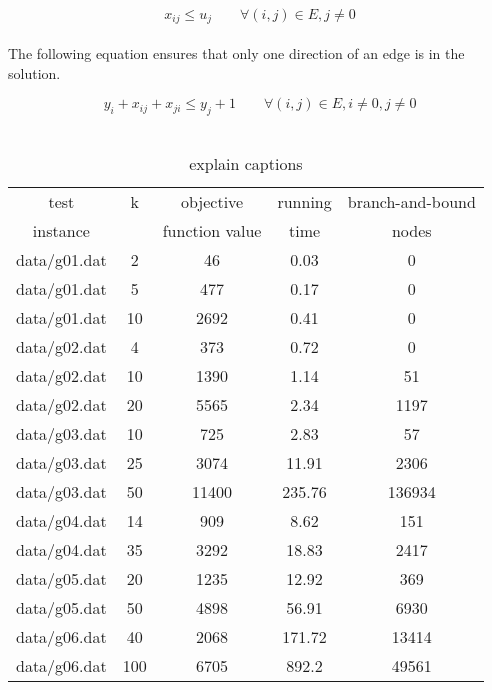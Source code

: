 \begin{equation}
  x_{ij} \leq u_j \qquad \forall (i,j) \in E, j \neq 0
\end{equation}
\\
The following equation ensures that only one direction of an edge is in the solution.

\begin{equation}
 y_{i} + x_{ij} + x_{ji} \leq y_{j} + 1 \qquad \forall (i,j) \in E, i \neq 0, j \neq 0
\end{equation}
\\

\begin{table} 
\small
\centering
\begin{tabular}{ccccc}
\hline
test     & k & objective      & running & branch-and-bound \\
instance &   & function value & time    & nodes \\
\hline
data/g01.dat		& 2	& 46	& 0.03	& 0	\\ 
data/g01.dat		& 5	& 477	& 0.17	& 0	\\ 
data/g01.dat		& 10	& 2692	& 0.41	& 0	\\ 
data/g02.dat		& 4	& 373	& 0.72	& 0	\\ 
data/g02.dat		& 10	& 1390	& 1.14	& 51	\\ 
data/g02.dat		& 20	& 5565	& 2.34	& 1197	\\ 
data/g03.dat		& 10	& 725	& 2.83	& 57	\\ 
data/g03.dat		& 25	& 3074	& 11.91	& 2306	\\ 
data/g03.dat		& 50	& 11400	& 235.76	& 136934	\\ 
data/g04.dat		& 14	& 909	& 8.62	& 151	\\ 
data/g04.dat		& 35	& 3292	& 18.83	& 2417	\\ 
data/g05.dat		& 20	& 1235	& 12.92	& 369	\\ 
data/g05.dat		& 50	& 4898	& 56.91	& 6930	\\ 
data/g06.dat		& 40	& 2068	& 171.72	& 13414	\\ 
data/g06.dat		& 100	& 6705	& 892.2	& 49561	\\ 

\hline
\end{tabular}
\caption{explain captions}
\label{tbl:scf_fast}
\end{table}
